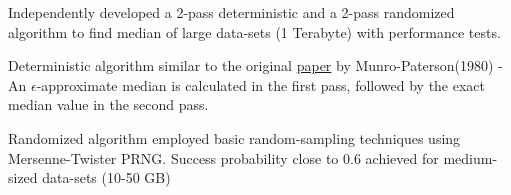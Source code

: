 \documentclass[letterpaper]{Formatting}
\begin{document}
\begin{minipage}[t]{0.66\textwidth}
Independently developed a 2-pass deterministic and a 2-pass randomized algorithm to find median of large data-sets (1 Terabyte) with performance tests. \\\vspace{1ex}
\vspace{1ex} %
\footnotesize {
\begin{tightitemize}
\item Deterministic algorithm similar to the original \href{http://polylogblog.files.wordpress.com/2009/08/80munro-median.pdf}{paper} by Munro-Paterson(1980) - An $\epsilon$-approximate median is calculated in the first pass, followed by the exact median value in the second pass.
\item Randomized algorithm employed basic random-sampling techniques using Mersenne-Twister PRNG. Success probability close to 0.6 achieved for medium-sized data-sets (10-50 GB)
\end{tightitemize}
}
\sectionspace %
\vspace{2ex}

\\\vspace{0.5ex}
\vspace{1ex}


\end{minipage}
\end{document}

